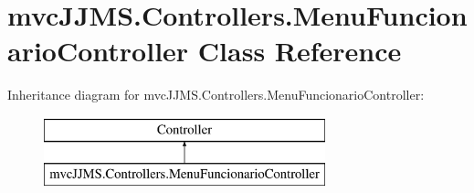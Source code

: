\hypertarget{classmvc_j_j_m_s_1_1_controllers_1_1_menu_funcionario_controller}{}\section{mvc\+J\+J\+M\+S.\+Controllers.\+Menu\+Funcionario\+Controller Class Reference}
\label{classmvc_j_j_m_s_1_1_controllers_1_1_menu_funcionario_controller}
Inheritance diagram for mvc\+J\+J\+M\+S.\+Controllers.\+Menu\+Funcionario\+Controller\+:\begin{figure}[H]
\begin{center}
\leavevmode
\includegraphics[height=2.000000cm]{classmvc_j_j_m_s_1_1_controllers_1_1_menu_funcionario_controller}
\end{center}
\end{figure}
